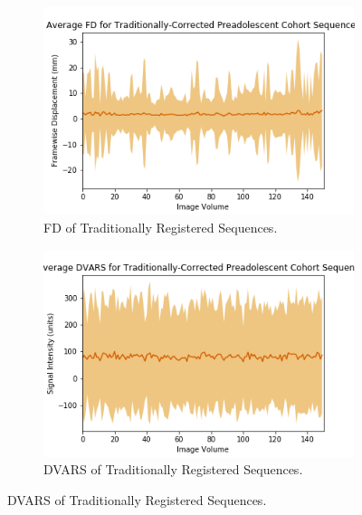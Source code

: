 \begin{figure}[t]
	\begin{subfigure}{0.4\textwidth}
		\centering
		\includegraphics[width=1.0\textwidth]{6/figures/preads-trad-fd-150.png}
		\caption{FD of Traditionally Registered Sequences.}
	\end{subfigure}
	\hspace{0.05\textwidth}
	\begin{subfigure}{0.4\textwidth}
		\centering
		\includegraphics[width=1.0\textwidth]{6/figures/preads-trad-dvars-150.png}
		\caption{DVARS of Traditionally Registered Sequences.}
	\end{subfigure}
	

\end{figure}

